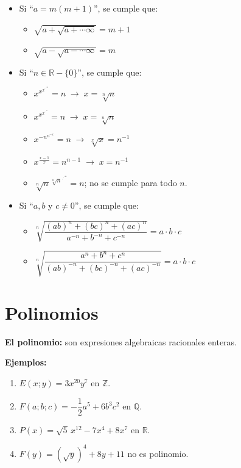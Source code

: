 \documentclass[11pt,a4paper]{article}
\begin{document}
\begin{itemize}[label=$\ast$]
  \item Si ``$a = m(m+1)$'', se cumple que:
  \begin{itemize}[label=\checkmark]
    \item $\sqrt{a+\sqrt{a+\cdots\infty}} = m+1$
    \item $\sqrt{a-\sqrt{a-\cdots\infty}} = m$
  \end{itemize}
  \item Si ``$n \in \mathbb{R}-\{0\}$'', se cumple que:
  \begin{itemize}[label=\checkmark]
    \item $x^{x^{x^{\cdot^{\cdot^{\cdot\infty}}}}} = n \;\rightarrow\; x = \sqrt[n]{n}$
    \item $x^{x^{x^{\cdot^{\cdot^{\cdot n}}}}} = n \;\rightarrow\; x = \sqrt[n]{n}$
    \item $x^{-n^{n^{-x}}} = n \;\rightarrow\; \sqrt[x]{x} = n^{-1}$
    \item $x^{\frac{x-1}{x}} = n^{n-1} \;\rightarrow\; x = n^{-1}$
    \item $\sqrt[n]{n}^{\sqrt[n]{n}^{\cdot^{\cdot^{\cdot\infty}}}} = n$; no se cumple para todo $n$.
  \end{itemize}
  \item Si ``$a, b$ y $c \neq 0$'', se cumple que:
  \begin{itemize}[label=\checkmark]
    \item $\sqrt[n]{\dfrac{(ab)^n+(bc)^n+(ac)^n}{a^{-n}+b^{-n}+c^{-n}}} = a\cdot b\cdot c$
    \item $\sqrt[n]{\dfrac{a^n+b^n+c^n}{(ab)^{-n}+(bc)^{-n}+(ac)^{-n}}} = a\cdot b\cdot c$
  \end{itemize}
\end{itemize}

\newpage
\section{Polinomios}

\textbf{El polinomio:} son expresiones algebraicas racionales enteras.

\textbf{Ejemplos:}
\begin{enumerate}[label=\alph*)]
  \item $E(x;y) = 3x^{20}y^{7}$ \quad en $\mathbb{Z}$.
  \item $F(a;b;c) = -\dfrac{1}{2}a^{5} + 6b^{3}c^{2}$ \quad en $\mathbb{Q}$.
  \item $P(x) = \sqrt{5}\,x^{12} - 7x^{4} + 8x^{7}$ \quad en $\mathbb{R}$.
  \item $F(y) = (\sqrt{y})^{4} + 8y + 11$ \quad \textcolor{rojo}{no es polinomio}.
\end{enumerate}
\end{document}
